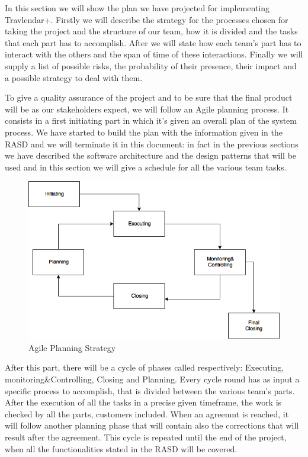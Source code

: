 In this section we will show the plan we have projected for implementing Travlendar+. 
Firstly we will describe the strategy for the processes chosen for taking the project and the structure of our team, how it is divided and the tasks that each part has to accomplish.
After we will state how each team’s part has to interact with the others and the span of time of these interactions. 
Finally we will supply a list of possible risks, the probability of their presence, their impact and a possible strategy to deal with them.

To give a quality assurance of the project and to be sure that the final product will be as our stakeholders expect, we will follow an Agile planning process. It consists in a first initiating part in which it’s given an overall plan of the system process. We have started to build the plan with the information given in the RASD and we will terminate it in this document: in fact in the previous sections we have described the software architecture and the design patterns that will be used and in this section we will give a schedule for all the various team tasks.
\begin{figure}[H]
	\centering
	\includegraphics[scale=0.35]{Images/Implementation/Agile_Planning}
	\caption{Agile Planning Strategy}
\end{figure}
After this part, there will be a cycle of phases called respectively: Executing, monitoring\&Controlling, Closing and Planning. 
Every cycle round has as input a specific process to accomplish, that is divided between the various team’s parts. After the execution of all the tasks in a precise given timeframe, the work is checked by all the parts, customers included. When an agreemnt is reached, it will follow another planning phase that will contain also the corrections that will result after the agreement.
This cycle is repeated until the end of the project, when all the functionalities stated in the RASD will be covered.

